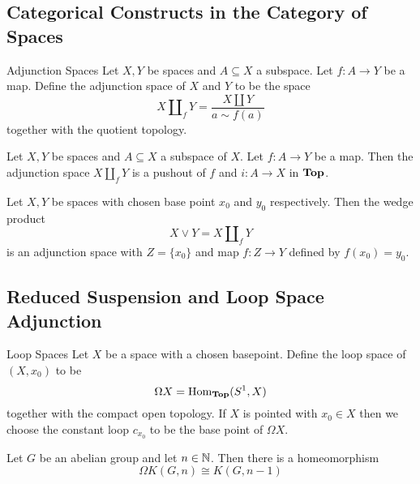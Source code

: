 \documentclass[a4paper]{article}
\begin{document}
\subsection{Categorical Constructs in the Category of Spaces}
\begin{defn}{Adjunction Spaces}{} Let $X,Y$ be spaces and $A\subseteq X$ a subspace. Let $f:A\to Y$ be a map. Define the adjunction space of $X$ and $Y$ to be  the space $$X\amalg_fY=\frac{X\amalg Y}{a\sim f(a)}$$ together with the quotient topology. 
\end{defn}

\begin{prp}{}{} Let $X,Y$ be spaces and $A\subseteq X$ a subspace of $X$. Let $f:A\to Y$ be a map. Then the adjunction space $X\amalg_f Y$ is a pushout of $f$ and $i:A\to X$ in $\bold{Top}$. 
\end{prp}

\begin{prp}{}{} Let $X,Y$ be spaces with chosen base point $x_0$ and $y_0$ respectively. Then the wedge product $$X\vee Y=X\amalg_fY$$ is an adjunction space with $Z=\{x_0\}$ and map $f:Z\to Y$ defined by $f(x_0)=y_0$. 
\end{prp}

\subsection{Reduced Suspension and Loop Space Adjunction}
\begin{defn}{Loop Spaces}{} Let $X$ be a space with a chosen basepoint. Define the loop space of $(X,x_0)$ to be $$\Omega X=\operatorname{Hom}_\bold{Top}(S^1,X)$$ together with the compact open topology. If $X$ is pointed with $x_0\in X$ then we choose the constant loop $c_{x_0}$ to be the base point of $\Omega X$. 
\end{defn}

\begin{lmm}{}{} Let $G$ be an abelian group and let $n\in\mathbb{N}$. Then there is a homeomorphism $$\Omega K(G,n)\cong K(G,n-1)$$
\end{lmm}
\end{document}
